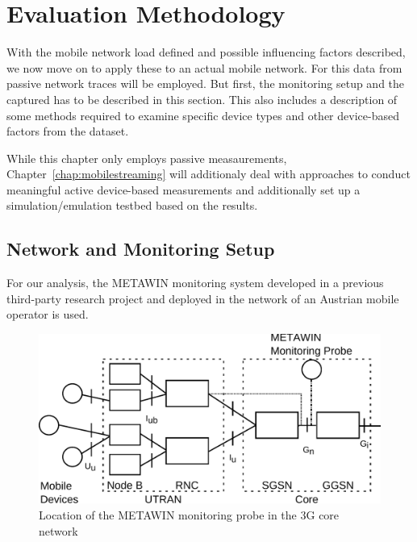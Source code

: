 \section{Evaluation Methodology}
\label{c4:sec:methodology}

With the mobile network load defined and possible influencing factors described, we now move on to apply these to an actual mobile network. For this data from passive network traces will be employed. But first, the monitoring setup and the captured has to be described in this section. This also includes a description of some methods required to examine specific device types and other device-based factors from the dataset.

While this chapter only employs passive measaurements, Chapter~\ref{chap:mobilestreaming} will additionaly deal with approaches to conduct meaningful active device-based measurements and additionally set up a simulation/emulation testbed based on the results.

\subsection{Network and Monitoring Setup}

For our analysis, the \gls{METAWIN} monitoring system developed in a previous third-party research project and deployed in the network of an Austrian mobile operator is used. \cite{ricciato_2011,ricciato2006traffic}

\begin{figure}[htb]
	\centering
	\includegraphics[width=1.0\textwidth]{images/umts-network.pdf}
	\caption{Location of the \acrshort{METAWIN} monitoring probe in the \gls{3G} core network}
	\label{c4:fig:umtsnetwork}
\end{figure}


